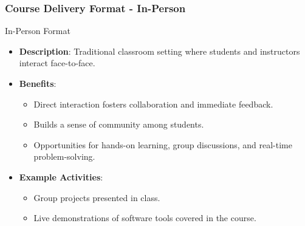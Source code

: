 \documentclass[aspectratio=169]{beamer}
\begin{document}
\begin{frame}[fragile]
    \frametitle{Course Delivery Format - In-Person}
    \begin{block}{In-Person Format}
        \begin{itemize}
            \item \textbf{Description}: Traditional classroom setting where students and instructors interact face-to-face.
            \item \textbf{Benefits}:
            \begin{itemize}
                \item Direct interaction fosters collaboration and immediate feedback.
                \item Builds a sense of community among students.
                \item Opportunities for hands-on learning, group discussions, and real-time problem-solving.
            \end{itemize}
            \item \textbf{Example Activities}:
            \begin{itemize}
                \item Group projects presented in class.
                \item Live demonstrations of software tools covered in the course.
            \end{itemize}
        \end{itemize}
    \end{block}
\end{frame}
\end{document}
